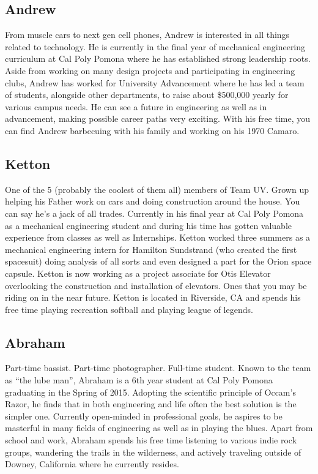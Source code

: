 \documentclass{report}
\begin{document}
\subsection{Andrew}
From muscle cars to next gen cell phones, Andrew is interested in all things related to technology.  He is currently in the final year of mechanical engineering curriculum at Cal Poly Pomona where he has established strong leadership roots.  Aside from working on many design projects and participating in engineering clubs, Andrew has worked for University Advancement where he has led a team of students, alongside other departments, to raise about \$500,000 yearly for various campus needs.  He can see a future in engineering as well as in advancement, making possible career paths very exciting.  With his free time, you can find Andrew barbecuing with his family and working on his 1970 Camaro.
\subsection{Ketton}
One of the 5 (probably the coolest of them all) members of Team UV.  Grown up helping his Father work on cars and doing construction around the house.  You can say he’s  a jack of all trades.  Currently in his final year at Cal Poly Pomona as a mechanical engineering student and during his time has gotten valuable experience from classes as well as Internships.  Ketton worked three summers as a mechanical engineering intern for Hamilton Sundstrand (who created the first spacesuit) doing analysis of all sorts and even designed a part for the Orion space capsule.  Ketton is now working as a project associate for Otis Elevator overlooking the construction and installation of elevators.  Ones that you may be riding on in the near future.  Ketton is located in Riverside, CA and spends his free time playing recreation softball and playing league of legends.
\subsection{Abraham}
Part-time bassist.  Part-time photographer.  Full-time student.  Known to the team as “the lube man”, Abraham is a 6th year student at Cal Poly Pomona graduating in the Spring of 2015.  Adopting the scientific principle of Occam’s Razor, he finds that in both engineering and life often the best solution is the simpler one.  Currently open-minded in professional goals, he aspires to be masterful in many fields of engineering as well as in playing the blues.  Apart from school and work, Abraham spends his free time listening to various indie rock groups, wandering the trails in the wilderness, and actively traveling outside of Downey, California where he currently resides.
\appendix
\end{document}
